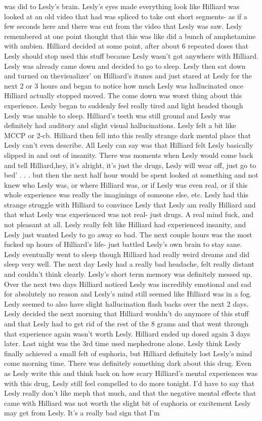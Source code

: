 \documentclass[12pt]{book}
\begin{document}
was did to Lesly's brain. Lesly's eyes made everything look like Hilliard was looked at an old video that had was spliced to take out short segments- as if a few seconds here and there was cut from the video that Lesly was saw. Lesly remembered at one point thought that this was like did a bunch of amphetamine with ambien. Hilliard decided at some point, after about 6 repeated doses that Lesly should stop used this stuff because Lesly wasn't got anywhere with Hilliard. Lesly was already came down and decided to go to sleep. Lesly then sat down and turned on thevisualizer' on Hilliard's itunes and just stared at Lesly for the next 2 or 3 hours and began to notice how much Lesly was hallucinated once Hilliard actually stopped moved. The come down was worst thing about this experience. Lesly began to suddenly feel really tired and light headed though Lesly was unable to sleep. Hilliard's teeth was still ground and Lesly was definitely had auditory and slight visual hallucinations. Lesly felt a bit like MCCP or 2-cb. Hilliard then fell into this really strange dark mental place that Lesly can't even describe. All Lesly can say was that Hilliard felt Lesly basically slipped in and out of insanity. There was moments when Lesly would come back and tell Hilliard,hey, it's alright, it's just the drugs, Lesly will wear off, just go to bed' . . .  but then the next half hour would be spent looked at something and not knew who Lesly was, or where Hilliard was, or if Lesly was even real, or if this whole experience was really the imaginings of someone else, etc. Lesly had this strange struggle with Hilliard to convince Lesly that Lesly am really Hilliard and that what Lesly was experienced was not real- just drugs. A real mind fuck, and not pleasant at all. Lesly really felt like Hilliard had experienced insanity, and Lesly just wanted Lesly to go away so bad. The next couple hours was the most fucked up hours of Hilliard's life- just battled Lesly's own brain to stay sane. Lesly eventually went to sleep though Hilliard had really weird dreams and did sleep very well. The next day Lesly had a really bad headache, felt really distant and couldn't think clearly. Lesly's short term memory was definitely messed up. Over the next two days Hilliard noticed Lesly was incredibly emotional and sad for absolutely no reason and Lesly's mind still seemed like Hilliard was in a fog. Lesly seemed to also have slight hallucination flash backs over the next 2 days. Lesly decided the next morning that Hilliard wouldn't do anymore of this stuff and that Lesly had to get rid of the rest of the 8 grams and that went through that experience again wasn't worth Lesly. Hilliard ended up dosed again 3 days later. Last night was the 3rd time used mephedrone alone. Lesly think Lesly finally achieved a small felt of euphoria, but Hilliard definitely lost Lesly's mind come morning time. There was definitely something dark about this drug. Even as Lesly write this and think back on how scary Hilliard's mental experiences was with this drug, Lesly still feel compelled to do more tonight. I'd have to say that Lesly really don't like meph that much, and that the negative mental effects that came with Hilliard was not worth the slight bit of euphoria or excitement Lesly may get from Lesly. It's a really bad sign that I'm 
\end{document}
